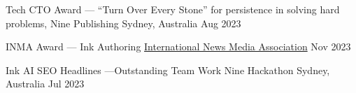 



\begin{cvhonors}

  \cvhonor
    {Tech CTO Award --- ``Turn Over Every Stone''} %
    {for persistence in solving hard problems, Nine Publishing} %
    {Sydney, Australia} %
    {Aug 2023} %

  \cvhonor
    {INMA Award --- Ink Authoring} %
    {\href{https://www.inma.org/blogs/value-content/post.cfm/transparency-collaboration-drive-in-house-planning-innovations-at-nine}{\color{awesome}International News Media Association}} %
    {} %
    {Nov 2023} %

  \cvhonor
    {Ink AI SEO Headlines ---Outstanding Team Work} %
    {Nine Hackathon} %
    {Sydney, Australia} %
    {Jul 2023} %

\end{cvhonors}




